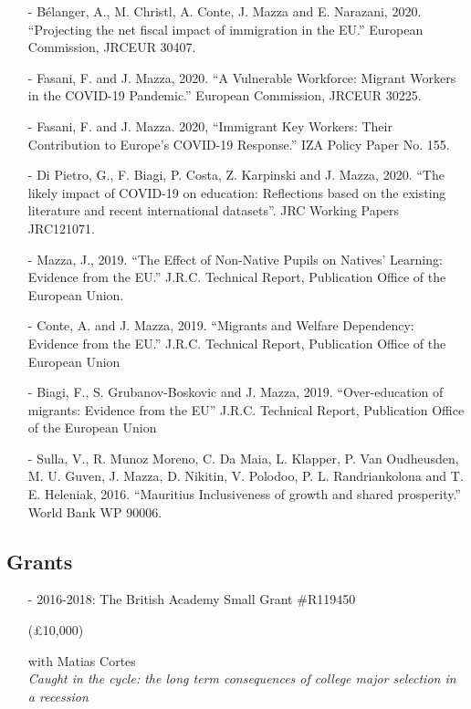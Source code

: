 \documentclass[11pt]{article}
\begin{document}
\begin{itemize}[itemsep=0pt, leftmargin=20pt]
\item [-]B\'elanger, A., M. Christl, A. Conte, J. Mazza and E. Narazani, 2020. {``Projecting the net fiscal impact of immigration in the EU.''}
European Commission, JRC\textendash EUR 30407.
\item [-]Fasani, F. and J. Mazza, 2020. {``A Vulnerable Workforce: Migrant Workers in the COVID-19 Pandemic.''}
European Commission, JRC\textendash EUR 30225.
\item [-]Fasani, F. and J. Mazza. 2020, {``Immigrant Key Workers: Their Contribution to Europe's COVID-19 Response.''} IZA Policy Paper No. 155.
\item [-]Di Pietro, G., F. Biagi, P. Costa, Z. Karpinski and J. Mazza, 2020. {``The likely impact of COVID-19 on education: Reflections based on the existing literature and recent international datasets''}. JRC Working Papers JRC121071.
\item [-]Mazza, J., 2019. ``{The Effect of Non-Native Pupils on Natives' Learning: Evidence from the EU}.''
J.R.C. Technical Report, Publication Office of the European Union.
\item [-]Conte, A. and J. Mazza, 2019. ``{Migrants and Welfare Dependency: Evidence from the EU}.''
J.R.C. Technical Report, Publication Office of the European Union
\item [-]Biagi, F., S. Grubanov-Boskovic and J. Mazza,
2019. ``Over-education of migrants: Evidence from the EU'' J.R.C. Technical Report, Publication Office of the European Union
\item [-]Sulla, V., R. Munoz Moreno, C. Da Maia, L. Klapper, P. Van Oudheusden, M. U. Guven, J. Mazza, D. Nikitin, V. Polodoo, P. L. Randriankolona and T. E. Heleniak, 2016.
``{Mauritius \textendash Inclusiveness of growth and shared prosperity}.'' World Bank WP 90006.

\end{itemize}

\subsection*{\sc Grants }

\begin{itemize}[itemsep=0pt, leftmargin=20pt]
\item [-]2016-2018: The British Academy Small Grant \#R119450
\begin{money}
(\pounds10,000)
\end{money}
with Matias Cortes \\
\emph{Caught in the cycle: the long term consequences of college major selection in a recession}

\end{itemize}
\end{document}
